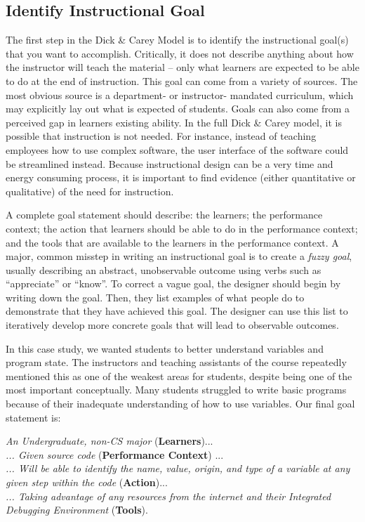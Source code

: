 \documentclass{sig-alternate}
\begin{document}
\subsection{Identify Instructional Goal}

The first step in the Dick \& Carey Model is to identify the instructional goal(s) that you want to accomplish.
Critically, it does not describe anything about how the instructor will teach the material -- only what learners are expected to be able to do at the end of instruction.
This goal can come from a variety of sources.
The most obvious source is a department- or instructor- mandated curriculum, which may explicitly lay out what is expected of students.
Goals can also come from a perceived gap in learners existing ability.
In the full Dick \& Carey model, it is possible that instruction is not needed.
For instance, instead of teaching employees how to use complex software, the user interface of the software could be streamlined instead.
Because instructional design can be a very time and energy consuming process, it is important to find evidence (either quantitative or qualitative) of the need for instruction.

A complete goal statement should describe: the learners; the performance context; the action that learners should be able to do in the performance context; and the tools that are available to the learners in the performance context.
A major, common misstep in writing an instructional goal is to create a \textit{fuzzy goal}, usually describing an abstract, unobservable outcome using verbs such as ``appreciate'' or ``know''.
To correct a vague goal, the designer should begin by writing down the goal.
Then, they list examples of what people do to demonstrate that they have achieved this goal.
The designer can use this list to iteratively develop more concrete goals that will lead to observable outcomes.

In this case study, we wanted students to better understand variables and program state.
The instructors and teaching assistants of the course repeatedly mentioned this as one of the weakest areas for students, despite being one of the most important conceptually.
Many students struggled to write basic programs because of their inadequate understanding of how to use variables.
Our final goal statement is:

\textit{An Undergraduate, non-CS major} (\textbf{Learners})...\\
\textit{... Given source code} (\textbf{Performance Context}) ...\\
\textit{... Will be able to identify the name, value, origin, and type of a variable at any given step within the code} (\textbf{Action})... \\
\textit{... Taking advantage of any resources from the internet and their Integrated Debugging Environment} (\textbf{Tools}).
\end{document}
